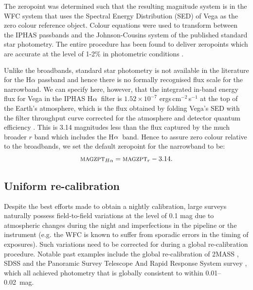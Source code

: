 \documentclass[useAMS,usenatbib]{mn2e}
\def\ha{\mbox{H$\rm \alpha$}}
\begin{document}
The zeropoint was determined such that the resulting magnitude system
is in the WFC system that uses the Spectral Energy Distribution (SED) of Vega 
as the zero colour reference object. 
Colour equations were used to transform between the IPHAS passbands 
and the Johnson-Cousins system 
of the published standard star photometry.
The entire procedure has been found to deliver zeropoints which 
are accurate at the level of 1-2\% 
in photometric conditions \citep{Gonzalez-Solares2011}.

Unlike the broadbands, 
standard star photometry is not available in the literature 
for the H$\alpha$ passband
and hence there is no formally recognised flux scale 
for the narrowband.
We can specify here, however, 
that the integrated in-band energy flux for Vega 
in the IPHAS \ha\ filter 
is $1.52 \times 10^{-7}$ ergs\,cm$^{-2}$\,s$^{-1}$ 
at the top of the Earth's atmosphere,
which is the flux obtained by folding 
Vega's SED with the filter throughput curve 
corrected for the atmosphere and detector quantum efficiency
\citep[following the method explained by][]{Drew2005}.
This is 3.14 magnitudes less than the flux captured 
by the much broader $r$ band
which includes the \ha\ band.
Hence to assure zero colour relative to the broadbands,
we set the default zeropoint for the narrowband to be:
\begin{equation}
\textsc{magzpt}_{H\alpha} = \textsc{magzpt}_r - 3.14.
\label{eqn:zpha}
\end{equation}

\subsection{Uniform re-calibration}

Despite the best efforts made to obtain a nightly calibration,
large surveys naturally possess field-to-field variations
at the level of 0.1 mag
due to atmospheric changes during the night
and imperfections in the pipeline or the instrument
(e.g. the WFC is known to suffer from sporadic errors
in the timing of exposures).
Such variations need to be corrected for 
during a global re-calibration procedure.
Notable past examples include the global re-calibration 
of 2MASS \citep[][]{Nikolaev2000},
SDSS \citep[][]{Padmanabhan2008}
and the Panoramic Survey Telescope 
And Rapid Response System survey \citep[Pan-STARRS;][]{Schlafly2012},
which all achieved photometry 
that is globally consistent to within 0.01--0.02~mag.
\end{document}
